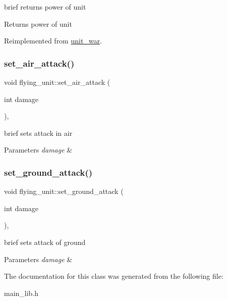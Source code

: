 brief returns power of unit \begin{DoxyReturn}{Returns}
power of unit 
\end{DoxyReturn}


Reimplemented from \mbox{\hyperlink{classunit__war_adea1fced490739cf8b7a6e49ec90cf59}{unit\+\_\+war}}.

\mbox{\label{classflying__unit_a2b220aabd9faa894c96bb13e03b5a9f5}} 
\subsubsection{\texorpdfstring{set\+\_\+air\+\_\+attack()}{set\_air\_attack()}}
{\footnotesize\ttfamily void flying\+\_\+unit\+::set\+\_\+air\+\_\+attack (\begin{DoxyParamCaption}\item[{int}]{damage }\end{DoxyParamCaption})\hspace{0.3cm}{\ttfamily [inline]}, {\ttfamily [protected]}}

brief sets attack in air 
\begin{DoxyParams}{Parameters}
{\em damage} & \\
\hline
\end{DoxyParams}
\mbox{\label{classflying__unit_a751bb2f477f2904a7de06218159c1dff}} 
\subsubsection{\texorpdfstring{set\+\_\+ground\+\_\+attack()}{set\_ground\_attack()}}
{\footnotesize\ttfamily void flying\+\_\+unit\+::set\+\_\+ground\+\_\+attack (\begin{DoxyParamCaption}\item[{int}]{damage }\end{DoxyParamCaption})\hspace{0.3cm}{\ttfamily [inline]}, {\ttfamily [protected]}}

brief sets attack of ground 
\begin{DoxyParams}{Parameters}
{\em damage} & \\
\hline
\end{DoxyParams}


The documentation for this class was generated from the following file\+:\begin{DoxyCompactItemize}
\item 
main\+\_\+lib.\+h\end{DoxyCompactItemize}
